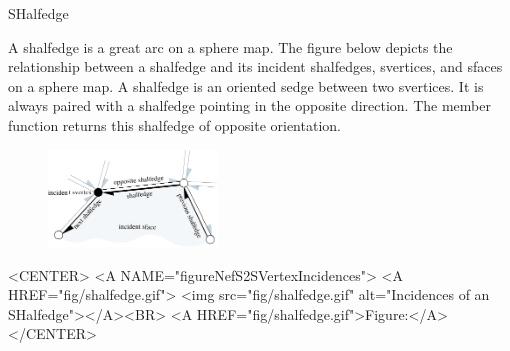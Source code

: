
\ccRefPageBegin



\begin{ccRefClass}{SHalfedge}

\ccDefinition

A shalfedge is a great arc on a sphere map. 
The figure below
depicts the relationship between a shalfedge and its incident
shalfedges, svertices, and sfaces on a sphere map.  A shalfedge is 
an oriented sedge between two svertices. It is always paired with a 
shalfedge pointing in
the opposite direction. The  member function returns
this shalfedge of opposite orientation.

\begin{ccTexOnly}
    \begin{figure}[bht]
        \begin{center}
          \parbox{0.4\textwidth}{%
              \includegraphics[width=0.4\textwidth]{Nef_S2_ref/fig/shalfedge}%
          }
        \end{center}
        \label{figureNefS2SVertexIncidences}
    \end{figure}
\end{ccTexOnly}

\begin{ccHtmlOnly}
    <CENTER>
    <A NAME="figureNefS2SVertexIncidences">
    <A HREF="fig/shalfedge.gif">
        <img src="fig/shalfedge.gif" 
             alt="Incidences of an SHalfedge"></A><BR>
    <A HREF="fig/shalfedge.gif">Figure:</A>
    </CENTER>
\end{ccHtmlOnly}


\end{ccRefClass}
